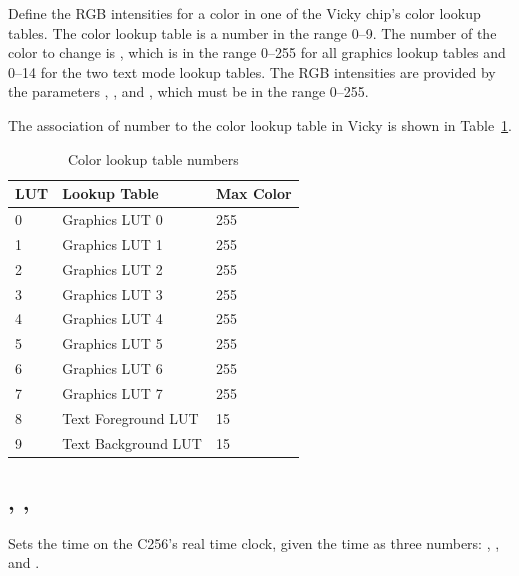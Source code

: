 \documentclass{report}
\begin{document}
    Define the RGB intensities for a color in one of the Vicky chip's color lookup tables.
    The color lookup table is a number  in the range 0--9.
    The number of the color to change is , which is in the range 0--255 for all graphics lookup tables
    and 0--14 for the two text mode lookup tables.
    The RGB intensities are provided by the parameters , , and , which 
    must be in the range 0--255.

    The association of  number to the color lookup table in Vicky
    is shown in Table~\ref{luts}.

    \begin{table}[!htb]
        \begin{center}
            \begin{tabular}{|l|l|l|} \hline
                LUT & Lookup Table & Max Color \\ \hline\hline
                0 & Graphics LUT 0 & 255 \\ \hline
                1 & Graphics LUT 1 & 255 \\ \hline
                2 & Graphics LUT 2 & 255 \\ \hline
                3 & Graphics LUT 3 & 255 \\ \hline
                4 & Graphics LUT 4 & 255 \\ \hline
                5 & Graphics LUT 5 & 255 \\ \hline
                6 & Graphics LUT 6 & 255 \\ \hline
                7 & Graphics LUT 7 & 255 \\ \hline
                8 & Text Foreground LUT & 15 \\ \hline
                9 & Text Background LUT & 15 \\ \hline
            \end{tabular}
        \end{center}
        \caption{Color lookup table numbers}
        \label{luts}
    \end{table}
    
    \subsection*{ , , }

    Sets the time on the C256's real time clock, given the time as three numbers:
    , , and .
\end{document}
